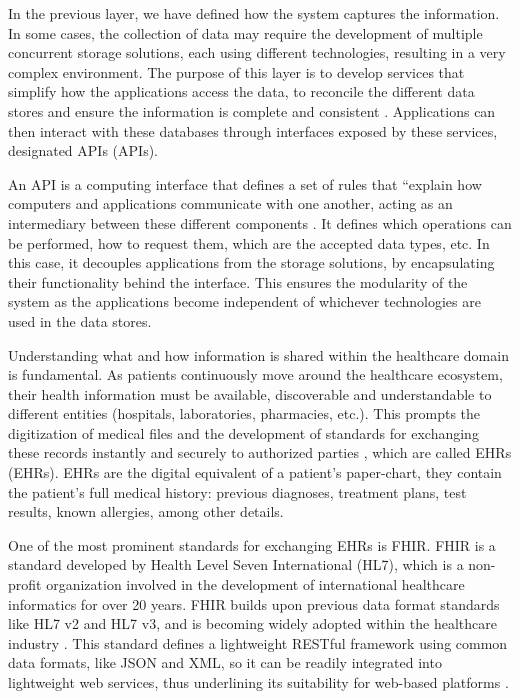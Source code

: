 
In the previous layer, we have defined how the system captures the information. In some cases, the collection of data may require the development of multiple concurrent storage solutions, each using different technologies, resulting in a very complex environment. The purpose of this layer is to develop services that simplify how the applications access the data, to reconcile the different data stores and ensure the information is complete and consistent \cite{Cisco2014}. Applications can then interact with these databases through interfaces exposed by these services, designated \acl{API}s (\acs{API}s). \bigskip 

An \acs{API} is a computing interface that defines a set of rules that ``explain how computers and applications communicate with one another, acting as an intermediary between these different components \cite{IBMAPI}. It defines which operations can be performed, how to request them, which are the accepted data types, etc. In this case, it decouples applications from the storage solutions, by encapsulating their functionality behind the interface. This ensures the modularity of the system as the applications become independent of whichever technologies are used in the data stores. \bigskip

Understanding what and how information is shared within the healthcare domain is fundamental. As patients continuously move around the healthcare ecosystem, their health information must be available, discoverable and understandable to different entities (hospitals, laboratories, pharmacies, etc.). This prompts the digitization of medical files and the development of standards for exchanging these records instantly and securely to authorized parties \cite{HL72019}, which are called \acl{EHR}s (\acs{EHR}s). \acs{EHR}s are the digital equivalent of a patient's paper-chart, they contain the patient's full medical history: previous diagnoses, treatment plans, test results, known allergies, among other details. \bigskip

One of the most prominent standards for exchanging \acs{EHR}s is \acf{FHIR}. \acs{FHIR} is a standard developed by Health Level Seven International (HL7), which is a non-profit organization involved in the development of international healthcare informatics for over 20 years. \acs{FHIR} builds upon previous data format standards like HL7 v2 and HL7 v3, and is becoming widely adopted within the healthcare industry \cite{Peng2019}. This standard defines a lightweight RESTful framework using common data formats, like JSON and XML, so it can be readily integrated into lightweight web services, thus underlining its suitability for web-based platforms \cite{Gruendner2019}.

